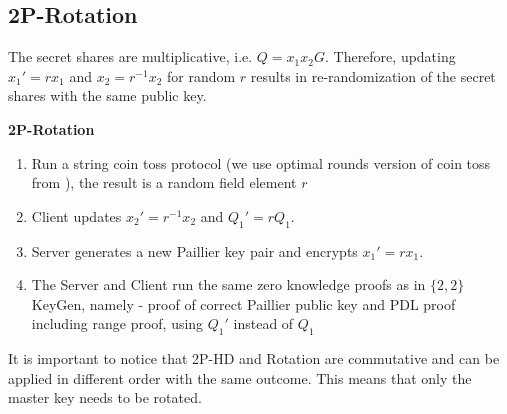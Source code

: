 \documentclass[runningheads]{llncs}
\begin{document}
\subsection{2P-Rotation}  
The secret shares are multiplicative, i.e. $Q=x_1x_2G$. Therefore, updating $x_1' = rx_1$ and $x_2 = r^{-1}x_2$ for random $r$ results in re-randomization of the secret shares with the same public key.
\begin{mdframed}[userdefinedwidth = 12.3cm]
\textbf{2P-Rotation}
\begin{enumerate}

\item Run a string coin toss protocol (we use optimal rounds version of coin toss from \cite{simulate}), the result is a random field element $r$
\item Client updates $x_2' = r^{-1}x_2$ and $Q_1' = rQ_1$. 
\item Server generates a new Paillier key pair and encrypts $x_1' = rx_1$. 
\item The Server and Client run the same zero knowledge proofs as in $\{2,2\}$ KeyGen, namely - proof of correct Paillier public key and PDL proof including range proof, using $Q_1'$ instead of $Q_1$
\end{enumerate}
\end{mdframed}
It is important to notice that 2P-HD and Rotation are commutative and can be applied in different order with the same outcome. This means that only the master key needs to be rotated. 
\end{document}
